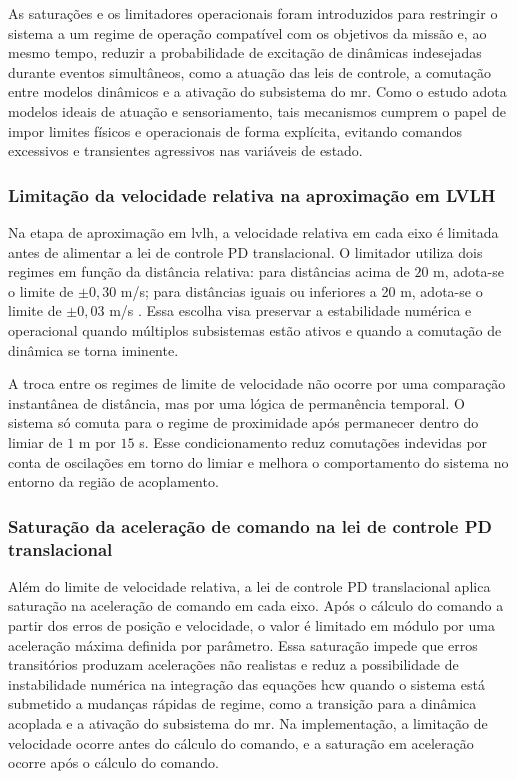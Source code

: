 As saturações e os limitadores operacionais foram introduzidos para restringir o sistema a um regime de operação compatível com os objetivos da missão e, ao mesmo tempo, reduzir a probabilidade de excitação de dinâmicas indesejadas durante eventos simultâneos, como a atuação das leis de controle, a comutação entre modelos dinâmicos e a ativação do subsistema do \gls{mr}.
Como o estudo adota modelos ideais de atuação e sensoriamento, tais mecanismos cumprem o papel de impor limites físicos e operacionais de forma explícita, evitando comandos excessivos e transientes agressivos nas variáveis de estado.

\subsubsection{Limitação da velocidade relativa na aproximação em LVLH}
\label{subsubsec:limitacao_veloc_relativa_lvlh}

Na etapa de aproximação em \gls{lvlh}, a velocidade relativa em cada eixo é limitada antes de alimentar a lei de controle PD translacional.
O limitador utiliza dois regimes em função da distância relativa: para distâncias acima de $20$ m, adota-se o limite de $\pm 0{,}30$ m/s; para distâncias iguais ou inferiores a 20 m, adota-se o limite de $\pm 0{,}03$ m/s \cite{vedant2025longrange}. 
Essa escolha visa preservar a estabilidade numérica e operacional quando múltiplos subsistemas estão ativos e quando a comutação de dinâmica se torna iminente.

A troca entre os regimes de limite de velocidade não ocorre por uma comparação instantânea de distância, mas por uma lógica de permanência temporal.
O sistema só comuta para o regime de proximidade após permanecer dentro do limiar de $1$ m por $15$ s.
Esse condicionamento reduz comutações indevidas por conta de oscilações em torno do limiar e melhora o comportamento do sistema no entorno da região de acoplamento.

\subsubsection{Saturação da aceleração de comando na lei de controle PD translacional}
\label{subsubsec:saturacao_acel_pd_translacional}

Além do limite de velocidade relativa, a lei de controle PD translacional aplica saturação na aceleração de comando em cada eixo.
Após o cálculo do comando a partir dos erros de posição e velocidade, o valor é limitado em módulo por uma aceleração máxima definida por parâmetro.
Essa saturação impede que erros transitórios produzam acelerações não realistas e reduz a possibilidade de instabilidade numérica na integração das equações \gls{hcw} quando o sistema está submetido a mudanças rápidas de regime, como a transição para a dinâmica acoplada e a ativação do subsistema do \gls{mr}.
Na implementação, a limitação de velocidade ocorre antes do cálculo do comando, e a saturação em aceleração ocorre após o cálculo do comando.

